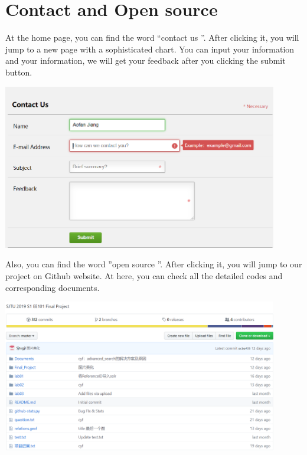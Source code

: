 \documentclass[10pt,twoside,a4paper,titlepage]{article}
\begin{document}
\section{Contact and Open source}
At the home page, you can find the word “contact us ”. After clicking it, you will jump to a new page with a sophisticated chart. You can input your information and your information, we will get your feedback after you clicking the submit button.\newline\par
\includegraphics[width=0.9\textwidth]{jaf/contact.PNG}\newline\par
Also, you can find the word ”open source ”. After clicking it, you will jump to our project on Github website. At here, you can check all the detailed codes and corresponding documents.\newline\par
\includegraphics[width=0.9\textwidth]{jaf/git.PNG}\newline\par
\newpage

\end{document}
